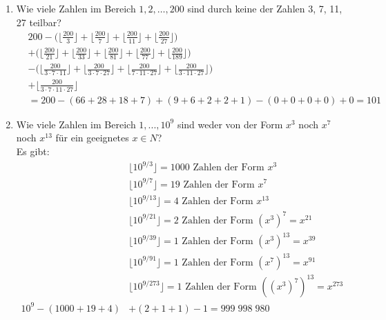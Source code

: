 \begin{enumerate}[label=(\alph*)]
        \item Wie viele Zahlen im Bereich $1, 2,\ldots, 200$ sind durch keine der Zahlen 3, 7, 11, 27 teilbar?\\
        \begin{align*}
	        &200 - \bigg(\bigg\lfloor\frac{200}{3}\bigg\rfloor + \bigg\lfloor\frac{200}{7}\bigg\rfloor
	         + \bigg\lfloor\frac{200}{11}\bigg\rfloor + \bigg\lfloor\frac{200}{27}\bigg\rfloor \bigg) \\
	        &+ \bigg(\bigg\lfloor\frac{200}{21}\bigg\rfloor + \bigg\lfloor\frac{200}{33}\bigg\rfloor 
	         + \bigg\lfloor\frac{200}{81}\bigg\rfloor + \bigg\lfloor\frac{200}{77}\bigg\rfloor
	         + \bigg\lfloor\frac{200}{189}\bigg\rfloor\bigg) \\ 
	        &-\bigg(\bigg\lfloor\frac{200}{3\cdot 7\cdot 11}
	         \bigg\rfloor+\bigg\lfloor\frac{200}{3\cdot 7\cdot 27}\bigg\rfloor + 
	         \bigg\lfloor\frac{200}{7\cdot 11\cdot 27}\bigg\rfloor +
	         \bigg\lfloor\frac{200}{3\cdot 11\cdot 27}\bigg\rfloor \bigg) \\
	        &+ \bigg\lfloor\frac{200}{3\cdot 7\cdot 11 \cdot 27}\bigg\rfloor \\
	        &= 200 - (66+28+18+7) + (9 + 6 + 2 + 2 + 1) - (0 + 0 + 0 + 0) + 0 = 101
        \end{align*}

        \item Wie viele Zahlen im Bereich $1,...,10^9$ sind weder von der Form $x^3$ noch $x^7$ 
        noch $x^{13}$ für ein geeignetes $x \in N$?\\
        Es gibt: 
	    \begin{align*}
	    &\lfloor 10^{9/3}\rfloor = 1000  \text{ Zahlen der Form } x^3 \\
	    &\lfloor 10^{9/7}\rfloor= 19  \text{ Zahlen der Form }x^7 \\
	    &\lfloor 10^{9/13}\rfloor= 4  \text{ Zahlen der Form }x^{13} \\
	    &\lfloor 10^{9/21}\rfloor= 2  \text{ Zahlen der Form } (x^{3})^7 = x^{21} \\
	    &\lfloor 10^{9/39}\rfloor= 1  \text{ Zahlen der Form } (x^{3})^{13} = x^{39} \\
	    &\lfloor 10^{9/91}\rfloor= 1  \text{ Zahlen der Form } (x^{7})^{13} = x^{91} \\
	    &\lfloor 10^{9/273}\rfloor= 1  \text{ Zahlen der Form } ((x^{3})^7)^{13} = x^{273} \\
	    10^9-(1000+19+4)&+(2+1+1)-1=999\; 998\; 980 \\
        \end{align*}
        

\end{enumerate}

